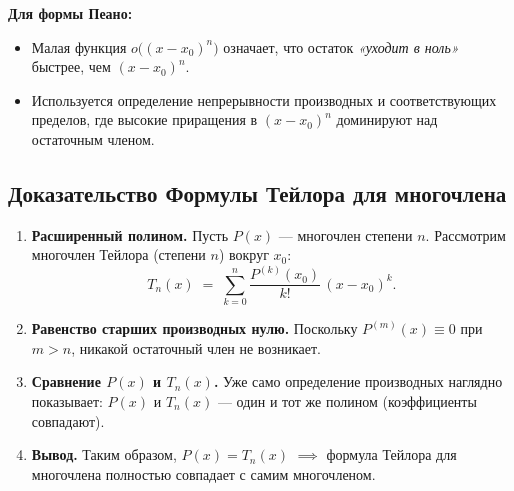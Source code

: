 \textbf{Для формы Пеано:}
\begin{itemize}
  \item Малая функция $o\bigl((x - x_0)^n\bigr)$ означает, что остаток \emph{«уходит в ноль»} быстрее, чем $(x - x_0)^n$.  
  \item Используется определение непрерывности производных и соответствующих пределов, где высокие приращения в $(x - x_0)^n$ доминируют над остаточным членом.
\end{itemize}

\medskip


\subsection*{Доказательство Формулы Тейлора для многочлена}
\begin{enumerate}
  \item \textbf{Расширенный полином.}  
  Пусть $P(x)$ — многочлен степени $n$. Рассмотрим многочлен Тейлора (степени $n$) вокруг $x_0$:
  \[
  T_n(x) \;=\; \sum_{k=0}^{n}\frac{P^{(k)}(x_0)}{k!}\,(x - x_0)^k.
  \]
  \item \textbf{Равенство старших производных нулю.}  
  Поскольку $P^{(m)}(x)\equiv0$ при $m>n$, никакой остаточный член не возникает.
  \item \textbf{Сравнение $P(x)$ и $T_n(x)$.}  
  Уже само определение производных наглядно показывает: $P(x)$ и $T_n(x)$ — один и тот же полином (коэффициенты совпадают).  
  \item \textbf{Вывод.}  
  Таким образом, $P(x) = T_n(x)$ \(\implies\) формула Тейлора для многочлена полностью совпадает с самим многочленом.
\end{enumerate}

